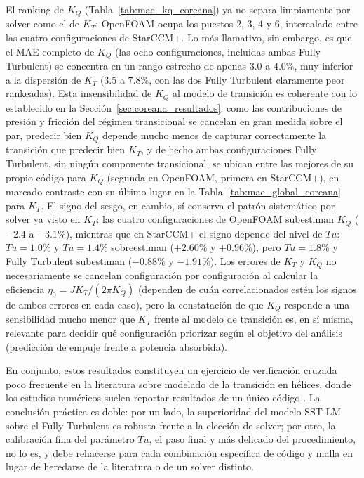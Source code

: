 El ranking de $K_Q$ (Tabla~\ref{tab:mae_kq_coreana}) ya no separa limpiamente por
solver como el de $K_T$: OpenFOAM ocupa los puestos $2$, $3$, $4$ y $6$, intercalado
entre las cuatro configuraciones de StarCCM+. Lo más llamativo, sin embargo, es que
el MAE completo de $K_Q$ (las ocho configuraciones, incluidas ambas Fully Turbulent) se concentra en un rango estrecho de apenas $3.0$ a $4.0\%$, muy inferior
a la dispersión de $K_T$ ($3.5$ a $7.8\%$, con las dos Fully Turbulent claramente
peor rankeadas). Esta insensibilidad de $K_Q$ al modelo de transición es coherente
con lo establecido en la Sección~\ref{sec:coreana_resultados}: como las
contribuciones de presión y fricción del régimen transicional se cancelan en gran
medida sobre el par, predecir bien $K_Q$ depende mucho menos de capturar
correctamente la transición que predecir bien $K_T$, y de hecho ambas
configuraciones Fully Turbulent, sin ningún componente transicional, se ubican
entre las mejores de su propio código para $K_Q$ (segunda en OpenFOAM, primera en
StarCCM+), en marcado contraste con su último lugar en la Tabla~\ref{tab:mae_global_coreana}
para $K_T$. El signo del sesgo, en cambio, sí conserva el patrón sistemático por
solver ya visto en $K_T$: las cuatro configuraciones de OpenFOAM subestiman $K_Q$
($-2.4$ a $-3.1\%$), mientras que en StarCCM+ el signo depende del nivel de $Tu$: $Tu=1.0\%$ y $Tu=1.4\%$ sobreestiman ($+2.60\%$ y $+0.96\%$), pero $Tu=1.8\%$ y
Fully Turbulent subestiman ($-0.88\%$ y $-1.91\%$). Los errores de $K_T$ y $K_Q$
no necesariamente se cancelan configuración por configuración al calcular la
eficiencia $\eta_0 = J K_T/(2\pi K_Q)$ (dependen de cuán correlacionados estén los
signos de ambos errores en cada caso), pero la constatación de que $K_Q$ responde a
una sensibilidad mucho menor que $K_T$ frente al modelo de transición es, en sí
misma, relevante para decidir qué configuración priorizar según el objetivo del
análisis (predicción de empuje frente a potencia absorbida).

En conjunto, estos resultados constituyen un ejercicio de verificación cruzada poco
frecuente en la literatura sobre modelado de la transición en hélices, donde los
estudios numéricos suelen reportar resultados de un único código
\citep{baltazar2018transition, gaggero2018transition}. La conclusión práctica es doble:
por un lado, la superioridad del modelo SST-LM sobre el Fully Turbulent es robusta
frente a la elección de solver; por otro, la calibración fina del parámetro $Tu$, el paso final y más delicado del procedimiento, no lo es, y debe rehacerse para
cada combinación específica de código y malla en lugar de heredarse de la literatura
o de un solver distinto.

